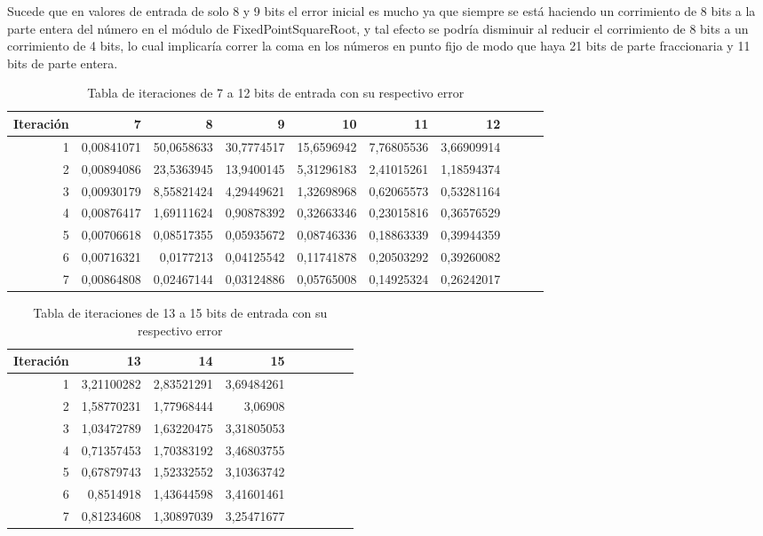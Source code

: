 Sucede que en valores de entrada de solo 8 y 9 bits el error inicial es mucho ya que siempre se está haciendo un corrimiento de 8 bits a la parte entera del número en el módulo de FixedPointSquareRoot, y tal efecto se podría disminuir  al reducir el corrimiento de 8 bits a un corrimiento de 4 bits, lo cual implicaría correr la coma en los números en punto fijo de modo que haya 21 bits de parte fraccionaria y 11 bits de parte entera.


\begin{table}[htbp]
  \centering
  \caption{Tabla de iteraciones de 7 a 12 bits de entrada con su respectivo error}
    \begin{tabular}{rrrrrrrrrr}
    \toprule
    Iteración & 7     & 8     & 9     & 10    & 11    & 12 \\
    \midrule
    1     & 0,00841071 & 50,0658633 & 30,7774517 & 15,6596942 & 7,76805536 & 3,66909914  \\
    2     & 0,00894086 & 23,5363945 & 13,9400145 & 5,31296183 & 2,41015261 & 1,18594374  \\
    3     & 0,00930179 & 8,55821424 & 4,29449621 & 1,32698968 & 0,62065573 & 0,53281164  \\
    4     & 0,00876417 & 1,69111624 & 0,90878392 & 0,32663346 & 0,23015816 & 0,36576529  \\
    5     & 0,00706618 & 0,08517355 & 0,05935672 & 0,08746336 & 0,18863339 & 0,39944359  \\
    6     & 0,00716321 & 0,0177213 & 0,04125542 & 0,11741878 & 0,20503292  & 0,39260082   \\
    7     & 0,00864808 & 0,02467144 & 0,03124886 & 0,05765008 & 0,14925324 & 0,26242017  \\
    \bottomrule
    \end{tabular}%
  \label{tab:addlabel}%
\end{table}%
\begin{table}[htbp]
  \centering
  \caption{Tabla de iteraciones de 13 a 15 bits de entrada con su respectivo error}
    \begin{tabular}{rrrrrrrrr}
    \toprule
    Iteración     & 13    & 14    & 15 \\
    \midrule
    1    &    3,21100282 & 2,83521291 & 3,69484261 \\
    2    &    1,58770231 & 1,77968444 & 3,06908    \\
    3    &    1,03472789 & 1,63220475 & 3,31805053 \\
    4    &    0,71357453 & 1,70383192 & 3,46803755 \\
    5	 &    0,67879743 & 1,52332552 & 3,10363742 \\
    6    &    0,8514918 & 1,43644598  & 3,41601461  \\
    7    &    0,81234608 & 1,30897039 & 3,25471677 \\
    \bottomrule
    \end{tabular}%
  \label{tab:errores2}%
\end{table}%
